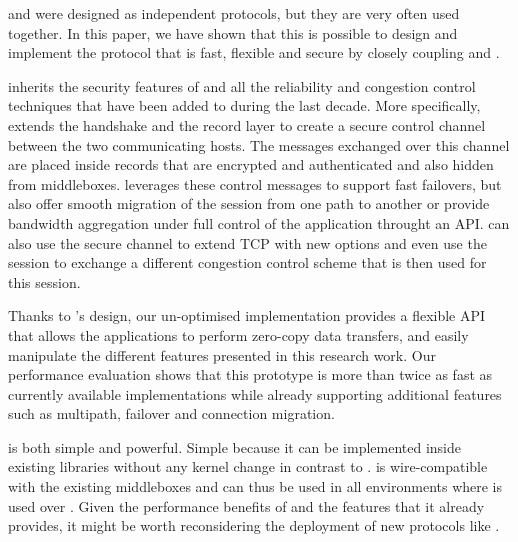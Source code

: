 \tcp and \tls were designed as independent protocols, but they are very often
used together. In this paper, we have shown that this is possible to design and
implement the \tcpls protocol that is fast, flexible and secure by closely
coupling \tcp and \tls.

\tcpls inherits the security features of  and all the reliability and
congestion control techniques that have been added to \tcp during the last
decade. More specifically, \tcpls extends the  handshake and the record
layer to create a secure control channel between the two communicating hosts.
The messages exchanged over this channel are placed inside \tls records that are
encrypted and authenticated and also hidden from middleboxes. \tcpls leverages
these control messages to support fast failovers, but also offer smooth
migration of the \tcpls session from one path to another or provide bandwidth
aggregation under full control of the application throught an API. \tcpls can
also use the secure channel to extend TCP with new options and even use the
\tcpls session to exchange a different congestion control scheme that is then
used for this session.

Thanks to \tcpls's design, our un-optimised \tcpls implementation provides a
flexible API that allows the applications to perform zero-copy data transfers,
and easily manipulate the different features presented in this research work.
Our performance evaluation shows that this prototype is more than twice as fast
as currently available \quic implementations while already supporting additional
features such as multipath, failover and connection migration.

\tcpls is both simple and powerful. Simple because it can be implemented inside
existing \tls libraries without any kernel change in contrast to \tcp. \tcpls is
wire-compatible with the existing \tcp middleboxes and can thus be used in all
environments where \tls is used over \tcp. Given the performance benefits of
\tcpls and the features that it already provides, it might be worth
reconsidering the deployment of new protocols like \quic.
